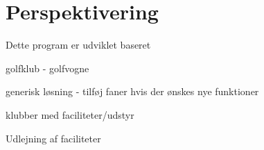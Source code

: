 \chapter{Perspektivering}
\label{cha:perspektivering}

Dette program er udviklet baseret

golfklub - golfvogne

generisk løsning - tilføj faner hvis der ønskes nye funktioner

klubber med faciliteter/udstyr

Udlejning af faciliteter

